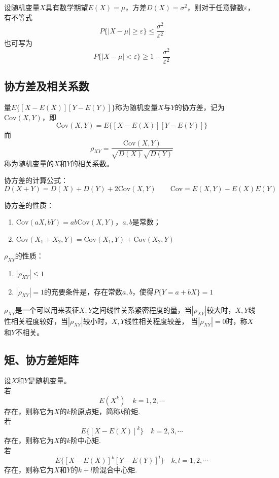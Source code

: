 \begin{theorem}
    设随机变量$X$具有数学期望$E(X)=\mu$，方差$D(X)=\sigma^2$，则对于任意整数$\varepsilon$，有不等式
    $$P\{|X-\mu|\geq \varepsilon\}\leq \frac{\sigma^2}{\varepsilon^2}$$
    也可写为$$P\{|X-\mu|<\varepsilon\}\geq 1- \frac{\sigma^2}{\varepsilon^2}$$
\end{theorem}

\subsection{协方差及相关系数}
\begin{definition}
    量$E\{[X-E(X)][Y-E(Y)]\}$称为随机变量$X$与$Y$的{\heiti 协方差}，记为$\mathrm{Cov}(X,Y)$，即
    $$\mathrm{Cov}(X,Y)=E\{[X-E(X)][Y-E(Y)]\}$$
    而$$\rho _{XY}=\frac{\mathrm{Cov}(X,Y)}{\sqrt{D(X)}\sqrt{D(Y)}}$$
    称为随机变量的$X$和$Y$的{\heiti 相关系数}。

    协方差的计算公式：
    $$D(X+Y)=D(X)+D(Y)+2\mathrm{Cov}(X,Y) \qquad \mathrm{Cov}=E(X,Y)-E(X)E(Y)$$
\end{definition}

\begin{theorem}
    协方差的性质：
    \begin{enumerate}
        \item $\mathrm{Cov}(aX,bY)=ab\mathrm{Cov}(X,Y)$，$a,b$是常数；
        \item $\mathrm{Cov}(X_1+X_2,Y)=\mathrm{Cov}(X_1,Y)+\mathrm{Cov}(X_2,Y)$
    \end{enumerate}
\end{theorem}

\begin{theorem}
    $\rho_{XY}$的性质：
    \begin{enumerate}
        \item $|\rho_{XY}|\leq 1$
        \item $|\rho_{XY}|= 1$的充要条件是，存在常数$a,b$，使得$P\{Y=a+bX\}=1$
    \end{enumerate}

    $\rho_{XY}$是一个可以用来表征$X,Y$之间线性关系紧密程度的量，当$|\rho_{XY}|$较大时，$X,Y$线性相关程度较好，当$|\rho_{XY}|$较小时，$X,Y$线性相关程度较差，
    当$|\rho_{XY}|=0$时，称$X$和$Y$不相关。    
\end{theorem}

\subsection{矩、协方差矩阵}
\begin{definition}
    设$X$和$Y$是随机变量。\\若
    $$E(X^k) \quad k=1,2,\cdots$$
    存在，则称它为$X$的{\heiti $k$阶原点矩}，简称{\heiti $k$阶矩}.
    \\若$$E\{[X-E(X)]^k\} \quad k=2,3,\cdots$$
    存在，则称它为$X$的{\heiti $k$阶中心矩}.
    \\若$$E\{[X-E(X)]^k[Y-E(Y)]^l\} \quad k,l=1,2,\cdots$$
    存在，则称它为$X$和$Y$的{\heiti $k+l$阶混合中心矩}.
\end{definition}

